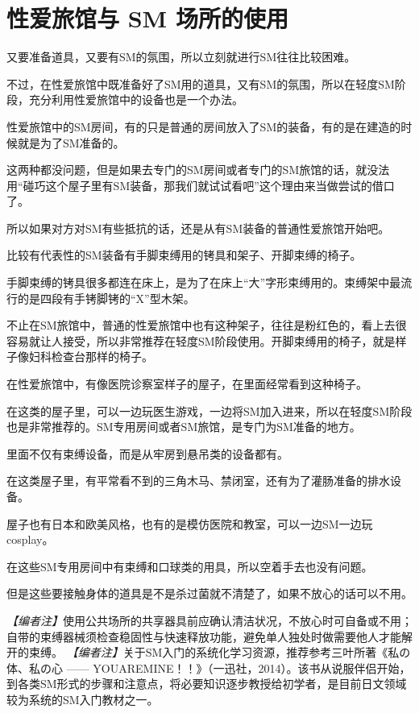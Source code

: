 \documentclass[12pt,UTF8]{ctexbook}
\begin{document}
\section{性爱旅馆与 SM 场所的使用}

又要准备道具，又要有SM的氛围，所以立刻就进行SM往往比较困难。

不过，在性爱旅馆中既准备好了SM用的道具，又有SM的氛围，所以在轻度SM阶段，充分利用性爱旅馆中的设备也是一个办法。

性爱旅馆中的SM房间，有的只是普通的房间放入了SM的装备，有的是在建造的时候就是为了SM准备的。

这两种都没问题，但是如果去专门的SM房间或者专门的SM旅馆的话，就没法用“碰巧这个屋子里有SM装备，那我们就试试看吧”这个理由来当做尝试的借口了。

所以如果对方对SM有些抵抗的话，还是从有SM装备的普通性爱旅馆开始吧。

比较有代表性的SM装备有手脚束缚用的铐具和架子、开脚束缚的椅子。

手脚束缚的铐具很多都连在床上，是为了在床上“大”字形束缚用的。束缚架中最流行的是四段有手铐脚铐的“X”型木架。

不止在SM旅馆中，普通的性爱旅馆中也有这种架子，往往是粉红色的，看上去很容易就让人接受，所以非常推荐在轻度SM阶段使用。开脚束缚用的椅子，就是样子像妇科检查台那样的椅子。

在性爱旅馆中，有像医院诊察室样子的屋子，在里面经常看到这种椅子。

在这类的屋子里，可以一边玩医生游戏，一边将SM加入进来，所以在轻度SM阶段也是非常推荐的。SM专用房间或者SM旅馆，是专门为SM准备的地方。

里面不仅有束缚设备，而是从牢房到悬吊类的设备都有。

在这类屋子里，有平常看不到的三角木马、禁闭室，还有为了灌肠准备的排水设备。

屋子也有日本和欧美风格，也有的是模仿医院和教室，可以一边SM一边玩cosplay。

在这些SM专用房间中有束缚和口球类的用具，所以空着手去也没有问题。

但是这些要接触身体的道具是不是杀过菌就不清楚了，如果不放心的话可以不用。

\noindent\textit{【编者注】}使用公共场所的共享器具前应确认清洁状况，不放心时可自备或不用；自带的束缚器械须检查稳固性与快速释放功能，避免单人独处时做需要他人才能解开的束缚。
\textit{【编者注】}关于SM入门的系统化学习资源，推荐参考三叶所著《私の体、私の心 —— YOUAREMINE！！》（一迅社，2014）。该书从说服伴侣开始，到各类SM形式的步骤和注意点，将必要知识逐步教授给初学者，是目前日文领域较为系统的SM入门教材之一。
\end{document}
